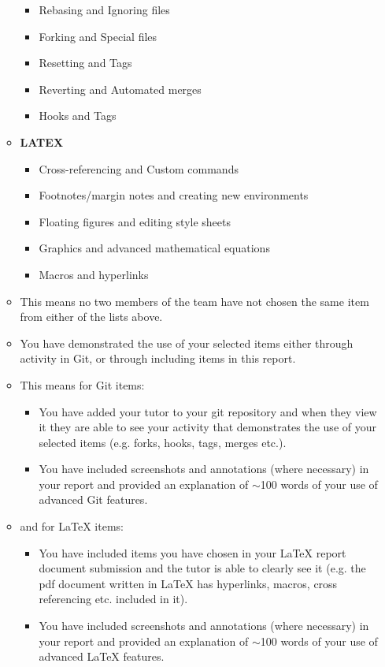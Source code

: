 \documentclass[a4paper, 11pt]{report}
\begin{document}
\begin{itemize}
\begin{itemize}
		\begin{itemize}
		\item Rebasing and Ignoring files
		\item Forking and Special files
		\item Resetting and Tags
		\item Reverting and Automated merges
		\item Hooks and Tags
		\end{itemize}
	\item \textbf{LATEX}
		\begin{itemize}
		\item Cross-referencing and Custom commands
		\item Footnotes/margin notes and creating new environments
		\item Floating figures and editing style sheets
		\item Graphics and advanced mathematical equations
		\item Macros and hyperlinks
		\end{itemize}
	\item This means no two members of the team have not chosen the same item from either of the lists above.
	\item You have demonstrated the use of your selected items either through activity in Git, or through including items in this report.
	\item This means for Git items:
		\begin{itemize}
		\item You have added your tutor to your git repository and when they view it they are able to see your activity that demonstrates the use of your selected items (e.g. forks, hooks, tags, merges etc.).
		\item You have included screenshots and annotations (where necessary) in your report and provided an explanation of $\sim$100 words of your use of advanced Git features.
		\end{itemize}
	\item and for LaTeX items:
		\begin{itemize}
		\item You have included items you have chosen in your LaTeX report document submission and the tutor is able to clearly see it (e.g. the pdf document written in LaTeX has hyperlinks, macros, cross referencing etc. included in it).
		\item You have included screenshots and annotations (where necessary) in your report and provided an explanation of $\sim$100 words of your use of advanced LaTeX features.

\end{itemize}
\end{itemize}
\end{itemize}
\end{document}
